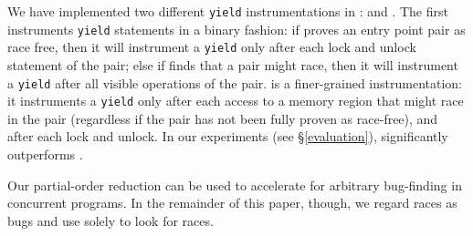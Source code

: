 We have implemented two different \texttt{yield} instrumentations in \whoop: \yieldcoarse and \yieldmr.
%
The first instruments \texttt{yield} statements in a binary fashion: if \whoop proves an entry point pair as race free, then it will instrument a \texttt{yield} only after each lock and unlock statement of the pair; else if \whoop finds that a pair might race, then it will instrument a \texttt{yield} after all visible operations of the pair.
%
\yieldmr is a finer-grained instrumentation: it instruments a \texttt{yield} only after each access to a memory region that might race in the pair (regardless if the pair has not been fully proven as race-free), and after each lock and unlock. In our experiments (see \S\ref{evaluation}), \yieldmr significantly outperforms \yieldcoarse.

Our partial-order reduction can be used to accelerate \corral for arbitrary bug-finding in concurrent programs. In the remainder of this paper, though, we regard races as bugs and use \corral solely to look for races.
